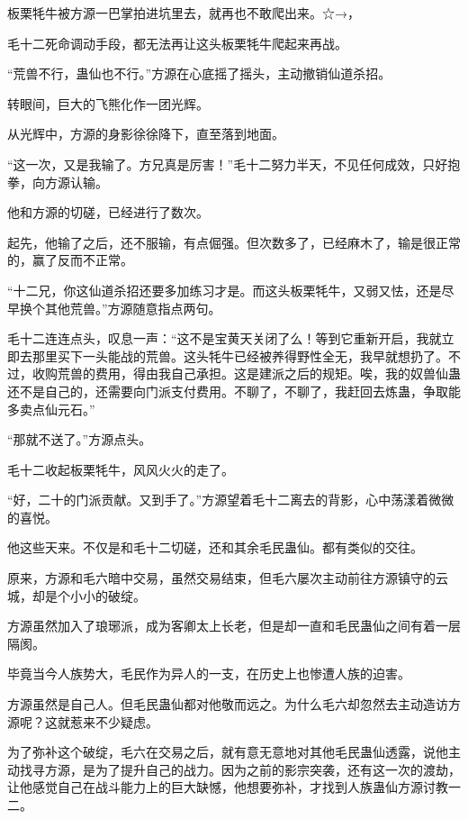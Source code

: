 
\begin{this_body}

板栗牦牛被方源一巴掌拍进坑里去，就再也不敢爬出来。☆→，

毛十二死命调动手段，都无法再让这头板栗牦牛爬起来再战。

“荒兽不行，蛊仙也不行。”方源在心底摇了摇头，主动撤销仙道杀招。

转眼间，巨大的飞熊化作一团光辉。

从光辉中，方源的身影徐徐降下，直至落到地面。

“这一次，又是我输了。方兄真是厉害！”毛十二努力半天，不见任何成效，只好抱拳，向方源认输。

他和方源的切磋，已经进行了数次。

起先，他输了之后，还不服输，有点倔强。但次数多了，已经麻木了，输是很正常的，赢了反而不正常。

“十二兄，你这仙道杀招还要多加练习才是。而这头板栗牦牛，又弱又怯，还是尽早换个其他荒兽。”方源随意指点两句。

毛十二连连点头，叹息一声：“这不是宝黄天关闭了么！等到它重新开启，我就立即去那里买下一头能战的荒兽。这头牦牛已经被养得野性全无，我早就想扔了。不过，收购荒兽的费用，得由我自己承担。这是建派之后的规矩。唉，我的奴兽仙蛊还不是自己的，还需要向门派支付费用。不聊了，不聊了，我赶回去炼蛊，争取能多卖点仙元石。”

“那就不送了。”方源点头。

毛十二收起板栗牦牛，风风火火的走了。

“好，二十的门派贡献。又到手了。”方源望着毛十二离去的背影，心中荡漾着微微的喜悦。

他这些天来。不仅是和毛十二切磋，还和其余毛民蛊仙。都有类似的交往。

原来，方源和毛六暗中交易，虽然交易结束，但毛六屡次主动前往方源镇守的云城，却是个小小的破绽。

方源虽然加入了琅琊派，成为客卿太上长老，但是却一直和毛民蛊仙之间有着一层隔阂。

毕竟当今人族势大，毛民作为异人的一支，在历史上也惨遭人族的迫害。

方源虽然是自己人。但毛民蛊仙都对他敬而远之。为什么毛六却忽然去主动造访方源呢？这就惹来不少疑虑。

为了弥补这个破绽，毛六在交易之后，就有意无意地对其他毛民蛊仙透露，说他主动找寻方源，是为了提升自己的战力。因为之前的影宗突袭，还有这一次的渡劫，让他感觉自己在战斗能力上的巨大缺憾，他想要弥补，才找到人族蛊仙方源讨教一二。


\end{this_body}
